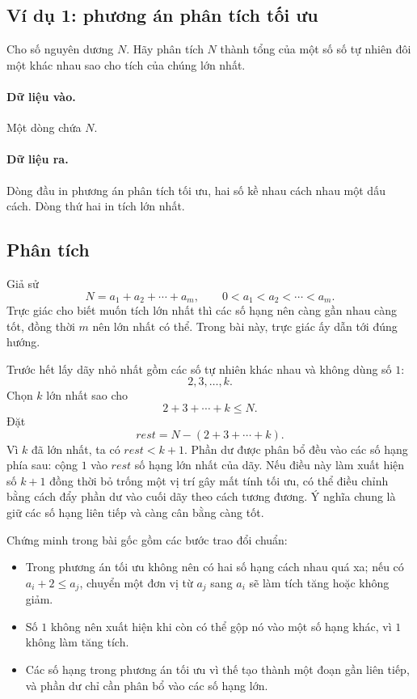 \documentclass[11pt]{article}
\begin{document}
\subsection{Ví dụ 1: phương án phân tích tối ưu}

Cho số nguyên dương \(N\). Hãy phân tích \(N\) thành tổng của một số số tự
nhiên đôi một khác nhau sao cho tích của chúng lớn nhất.

\paragraph{Dữ liệu vào.}
Một dòng chứa \(N\).

\paragraph{Dữ liệu ra.}
Dòng đầu in phương án phân tích tối ưu, hai số kề nhau cách nhau một dấu
cách. Dòng thứ hai in tích lớn nhất.

\subsection{Phân tích}

Giả sử
\[
  N=a_1+a_2+\cdots+a_m,\qquad
  0<a_1<a_2<\cdots<a_m.
\]
Trực giác cho biết muốn tích lớn nhất thì các số hạng nên càng gần nhau càng
tốt, đồng thời \(m\) nên lớn nhất có thể. Trong bài này, trực giác ấy dẫn tới
đúng hướng.

Trước hết lấy dãy nhỏ nhất gồm các số tự nhiên khác nhau và không dùng số
\(1\):
\[
  2,3,\ldots,k.
\]
Chọn \(k\) lớn nhất sao cho
\[
  2+3+\cdots+k \le N.
\]
Đặt
\[
  \mathit{rest}=N-(2+3+\cdots+k).
\]
Vì \(k\) đã lớn nhất, ta có \(\mathit{rest}<k+1\). Phần dư được phân bổ đều
vào các số hạng phía sau: cộng \(1\) vào \(\mathit{rest}\) số hạng lớn nhất
của dãy. Nếu điều này làm xuất hiện số \(k+1\) đồng thời bỏ trống một vị trí
gây mất tính tối ưu, có thể điều chỉnh bằng cách đẩy phần dư vào cuối dãy
theo cách tương đương. Ý nghĩa chung là giữ các số hạng liên tiếp và càng cân
bằng càng tốt.

Chứng minh trong bài gốc gồm các bước trao đổi chuẩn:

\begin{itemize}
  \item Trong phương án tối ưu không nên có hai số hạng cách nhau quá xa; nếu
  có \(a_i+2\le a_j\), chuyển một đơn vị từ \(a_j\) sang \(a_i\) sẽ làm tích
  tăng hoặc không giảm.
  \item Số \(1\) không nên xuất hiện khi còn có thể gộp nó vào một số hạng
  khác, vì \(1\) không làm tăng tích.
  \item Các số hạng trong phương án tối ưu vì thế tạo thành một đoạn gần liên
  tiếp, và phần dư chỉ cần phân bổ vào các số hạng lớn.
\end{itemize}
\end{document}

